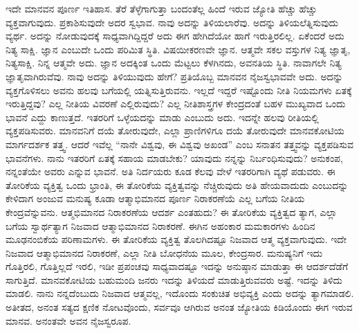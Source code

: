 ಇದೇ ಮಾನವನ ಪೂರ್ಣ ಇತಿಹಾಸ. ತೆರೆ ತೆಳ್ಳೆಗಾಗುತ್ತಾ ಬಂದಂತೆಲ್ಲ ಹಿಂದೆ ಇರುವ ಜ್ಯೋತಿ ಹೆಚ್ಚು ಹೆಚ್ಚು ವ್ಯಕ್ತವಾಗುವುದು. ಪ್ರಕಾಶಿಸುವುದೇ ಅದರ ಸ್ವಭಾವ. ನಾವು ಅದನ್ನು ತಿಳಿಯಲಾರೆವು. ಅದನ್ನು ತಿಳಿಯಲೆತ್ನಿಸುವುದು ವ್ಯರ್ಥ. ಅದನ್ನು ನೋಡುವುದಕ್ಕೆ ಸಾಧ್ಯವಾಗಿದ್ದಿದ್ದರೆ ಅದು ಈಗ ಹೇಗಿದೆಯೋ ಹಾಗೆ ಇರುತ್ತಿರಲಿಲ್ಲ. ಏಕೆಂದರೆ ಅದು ನಿತ್ಯ ಸಾಕ್ಷಿ. ಜ್ಞಾನ ಎಂಬುದೇ ಒಂದು ಪರಿಮಿತ ಸ್ಥಿತಿ. ವಿಷಯೀಕರಣವೇ ಜ್ಞಾನ. ಆತ್ಮವೇ ಸಕಲ ವಸ್ತುಗಳ ನಿತ್ಯ ಜ್ಞಾತೃ, ನಿತ್ಯಸಾಕ್ಷಿ. ನಿನ್ನ ಆತ್ಮವೇ ಅದು. ಜ್ಞಾನ ಅದಕ್ಕಿಂತ ಒಂದು ಮೆಟ್ಟಲು ಕೆಳಗಿನದು, ಅವನತಿಯ ಸ್ಥಿತಿ. ನಾವಾಗಲೇ ನಿತ್ಯ ಜ್ಞಾತೃವಾಗಿರುವೆವು. ನಾವು ಅದನ್ನು ತಿಳಿಯುವುದು ಹೇಗೆ? ಪ್ರತಿಯೊಬ್ಬ ಮಾನವನ ನೈಜಸ್ವಭಾವವೇ ಅದು. ಅದನ್ನು ವ್ಯಕ್ತಗೊಳಿಸಲು ಅವನು ಹಲವು ಬಗೆಯಲ್ಲಿ ಯತ್ನಿಸುತ್ತಿರುವನು. ಇಲ್ಲದೆ ಇದ್ದರೆ ಇಷ್ಟೊಂದು ನೀತಿ ನಿಯಮಗಳು ಏತಕ್ಕೆ ಇರುತ್ತಿದ್ದವು? ಎಲ್ಲ ನೀತಿಯ ವಿವರಣೆ ಎಲ್ಲಿರುವುದು? ಎಲ್ಲ ನೀತಿಶಾಸ್ತ್ರಗಳ ಕೇಂದ್ರದಂತೆ ಬಹಳ ಮುಖ್ಯವಾದ ಒಂದು ಭಾವನೆ ಎದ್ದು ಕಾಣುತ್ತದೆ. ಇತರರಿಗೆ ಒಳ್ಳೆಯದನ್ನು ಮಾಡು ಎಂಬುದು ಅದು. ಇದನ್ನೇ ಹಲವು ರೀತಿಯಲ್ಲಿ ವ್ಯಕ್ತಪಡಿಸುವರು. ಮಾನವನಿಗೆ ದಯೆ ತೋರುವುದೇ, ಎಲ್ಲಾ ಪ್ರಾಣಿಗಳಿಗೂ ದಯೆ ತೋರುವುದೇ ಮಾನವಕೋಟಿಯ ಮಾರ್ಗದರ್ಶಕ ತತ್ತ್ವ. ಆದರೆ ಇವೆಲ್ಲ “ನಾನೇ ವಿಶ್ವವು, ಈ ವಿಶ್ವವು ಅಖಂಡ” ಎಂಬ ಸನಾತನ ತತ್ತ್ವವನ್ನು ವ್ಯಕ್ತಪಡಿಸುವ ಭಾವನೆಗಳು. ನಾನು ಇತರರಿಗೆ ಏತಕ್ಕೆ ಸಹಾಯ ಮಾಡಬೇಕು? ಯಾವುದು ನನ್ನನ್ನು ನಿರ್ಬಂಧಿಸುವುದು? ಅನುಕಂಪ, ನನ್ನಂತೆಯೇ ಅವರು ಎನ್ನುವ ಭಾವನೆ. ಅತಿ ನಿರ್ದಯರು ಕೂಡ ಕೆಲವು ವೇಳೆ ಇತರರಿಗಾಗಿ ವ್ಯಥೆ ಪಡುವರು. ಈ ತೋರಿಕೆಯ ವ್ಯಕ್ತಿತ್ವ ಒಂದು ಭ್ರಾಂತಿ, ಈ ತೋರಿಕೆಯ ವ್ಯಕ್ತಿತ್ವವನ್ನು ನೆಚ್ಚಿರುವುದು ಅತಿ ಹೇಯವಾದುದು ಎಂಬುದನ್ನು ಕೇಳಿದಾಗ ಅಂಜುವ ಮನುಷ್ಯ ಕೂಡಾ ಆತ್ಮಾಭಿಮಾನದ ಪೂರ್ಣ ನಿರಾಕರಣೆಯೆ ಎಲ್ಲ ಬಗೆಯ ನೀತಿಯ ಕೇಂದ್ರವೆನ್ನುವನು. ಆತ್ಮಭಿಮಾನದ ನಿರಾಕರಣೆಯ ಆದರ್ಶ ಎಂತಹುದು? ಈ ತೋರಿಕೆಯ ವ್ಯಕ್ತಿತ್ವದ ತ್ಯಾಗ, ಎಲ್ಲಾ ಬಗೆಯ ಸ್ವಾರ್ಥತ್ಯಾಗ ನಿಜವಾದ ಆತ್ಮಾಭಿಮಾನದ ನಿರಾಕರಣೆ. ಈಗಿನ ಅಹಂಕಾರ ಮಮಕಾರಗಳು ಹಿಂದಿನ ಮೂಢನಂಬಿಕೆಯ ಪರಿಣಾಮಗಳು. ಈ ತೋರಿಕೆಯ ವ್ಯಕ್ತಿತ್ವ ತೊಲಗಿದಷ್ಟೂ ನಿಜವಾದ ಆತ್ಮ ವ್ಯಕ್ತವಾಗುವುದು. ಇದೇ ನಿಜವಾದ ಆತ್ಮಾಭಿಮಾನದ ನಿರಾಕರಣೆ, ಎಲ್ಲಾ ನೀತಿ ಬೋಧನೆಯ ಮೂಲ, ಕೇಂದ್ರಸಾರ. ಮನುಷ್ಯನಿಗೆ ಇದು ಗೊತ್ತಿರಲಿ, ಗೊತ್ತಿಲ್ಲದೆ ಇರಲಿ, ಇಡೀ ಪ್ರಪಂಚವು ಸಾಧ್ಯವಾದಷ್ಟೂ ಇದನ್ನು ಅನುಷ್ಠಾನ ಮಾಡುತ್ತಾ ಈ ಆದರ್ಶದೆಡೆಗೆ ಸಾಗುತ್ತಿದೆ. ಮಾನವಕೋಟಿಯ ಬಹುಮಂದಿ ಜನರು ಇದನ್ನು ತಿಳಿಯದೆ ಮಾಡುತ್ತಿರುವವರು ಅಷ್ಟೆ. ಇದನ್ನು ತಿಳಿದು ಮಾಡಲಿ. ನಾನು ನನ್ನದೆಂಬುದು ನಿಜವಾದ ಆತ್ಮವಲ್ಲ, ಇದೊಂದು ಸಂಕುಚಿತ ಅಭಿವ್ಯಕ್ತಿ ಎಂದು ಅದನ್ನು ತ್ಯಾಗಮಾಡಲಿ. ಅತೀತದ, ಅನಂತ ಸತ್ಯದ ಕ್ಷಣಿಕ ನೋಟವೊಂದು, ಸರ್ವವೂ ಆಗಿರುವ ಅನಂತ ಜ್ಯೋತಿಯ ಕಿಡಿಯೊಂದು ಈಗ ಇರುವ ಮಾನವ. ಅನಂತವೇ ಅವನ ನೈಜಸ್ವರೂಪ.

